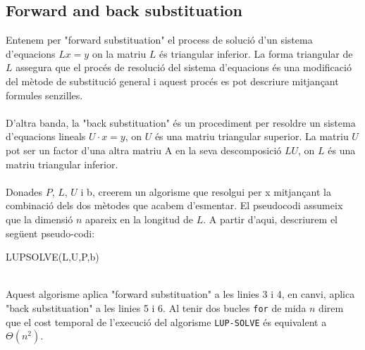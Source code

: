 \documentclass{article}
\begin{document}
\subsection{Forward and back substituation}
    Entenem per "forward substituation" el process de solució d'un sistema d'equacions $Lx=y$ on la matriu $L$ és triangular inferior. La forma triangular de $L$ assegura que el procés de resolució del sistema d'equacions és una modificació del mètode de substitució general i aquest procés es pot descriure mitjançant formules senzilles. \\ \\ 
    D'altra banda, la "back substituation" és un procediment per resoldre un sistema d'equacions lineals $U \cdot x = y$, on $U$ és una matriu triangular superior. La matriu $U$ pot ser un factor d'una altra matriu A en la seva descomposició $LU$, on $L$ és una matriu triangular inferior. \\ \\
    Donades $P$, $L$, $U$ i b, creerem un algorisme que resolgui per x mitjançant la combinació dels dos mètodes que acabem d'esmentar. El pseudocodi assumeix que la dimensió $n$ apareix en la longitud de $L$. A partir d'aqui, descriurem el següent pseudo-codi: 
    \begin{algorithm}[h]
        \caption{LUP\-SOLVE(L,U,P,b)}
        \begin{algorithmic}[1]
            \EndFor
            \EndFor
        \end{algorithmic}
    \end{algorithm} \\
    Aquest algorisme aplica "forward substituation" a les linies 3 i 4, en canvi, aplica "back substituation" a les linies 5 i 6. Al tenir dos bucles \texttt{for} de mida $n$ direm que el cost temporal de l'execució del algorisme \texttt{LUP-SOLVE} és equivalent a $\Theta(n^2)$.
\end{document}

